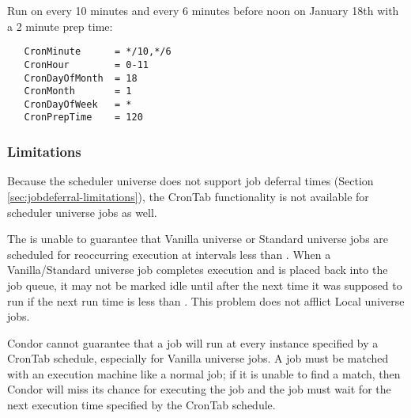 Run on every 10 minutes and every 6 minutes before noon 
on January 18th with a 2 minute prep time:

\begin{verbatim}
   CronMinute      = */10,*/6
   CronHour        = 0-11
   CronDayOfMonth  = 18
   CronMonth       = 1
   CronDayOfWeek   = *
   CronPrepTime    = 120
\end{verbatim}

\subsubsection{Limitations}
\label{sec:crontab-limitations}
Because the scheduler universe does not support job deferral times 
(Section \ref{sec:jobdeferral-limitations}), 
the CronTab functionality is not available for scheduler universe jobs as well.

The  is unable to guarantee that Vanilla universe 
or Standard universe jobs are scheduled for reoccurring execution 
at intervals less than . 
When a Vanilla/Standard universe job completes execution 
and is placed back into the job queue, 
it may not be marked idle until after the next time 
it was supposed to run if the next run time is less 
than . 
This problem does not afflict Local universe jobs.

Condor cannot guarantee that a job will run at every instance 
specified by a CronTab schedule, 
especially for Vanilla universe jobs. 
A job must be matched with an execution machine like a normal job; 
if it is unable to find a match, 
then Condor will miss its chance for executing the job 
and the job must wait for the next execution time 
specified by the CronTab schedule.

